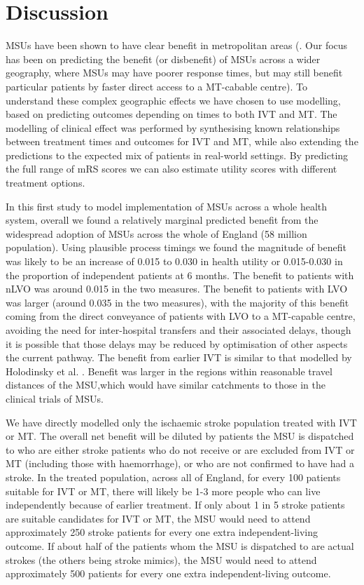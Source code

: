 \section{Discussion}


MSUs have been shown to have clear benefit in metropolitan areas (\cite{fatima_mobile_2020, chen_systematic_2022}. Our focus has been on predicting the benefit (or disbenefit) of MSUs across a wider geography, where MSUs may have poorer response times, but may still benefit particular patients by faster direct access to a MT-cabable centre). To understand these complex geographic effects we have chosen to use modelling, based on predicting outcomes depending on times to both IVT and MT. The modelling of clinical effect was performed by synthesising known relationships between treatment times and outcomes for IVT and MT, while also extending the predictions to the expected mix of patients in real-world settings. By predicting the full range of mRS scores we can also estimate utility scores with different treatment options.

In this first study to model implementation of MSUs across a whole health system, overall we found a relatively marginal predicted benefit from the widespread adoption of MSUs across the whole of England (58 million population). Using plausible process timings we found the magnitude of benefit was likely to be an increase of 0.015 to 0.030 in health utility or 0.015-0.030 in the proportion of independent patients at 6 months. The benefit to patients with nLVO was around 0.015 in the two measures. The benefit to patients with LVO was larger (around 0.035 in the two measures), with the majority of this benefit coming from the direct conveyance of patients with LVO to a MT-capable centre, avoiding the need for inter-hospital transfers and their associated delays, though it is possible that those delays may be reduced by optimisation of other aspects the current pathway. The benefit from earlier IVT is similar to that modelled by Holodinsky et al. \cite{holodinsky_jessalyn_k_what_2020}. Benefit was larger in the regions within reasonable travel distances of the MSU,which would have similar catchments to those in the clinical trials of MSUs.

We have directly modelled only the ischaemic stroke population treated with IVT or MT. The overall net benefit will be diluted by patients the MSU is dispatched to who are either stroke patients who do not receive or are excluded from IVT or MT (including those with haemorrhage), or who are not confirmed to have had a stroke. In the treated population, across all of England, for every 100 patients suitable for IVT or MT, there will likely be 1-3 more people who can live independently because of earlier treatment. If only about 1 in 5 stroke patients are suitable candidates for IVT or MT, the MSU would need to attend approximately 250 stroke patients for every one extra independent-living outcome. If about half of the patients whom the MSU is dispatched to are actual strokes (the others being stroke mimics), the MSU would need to attend approximately 500 patients for every one extra independent-living outcome. 

